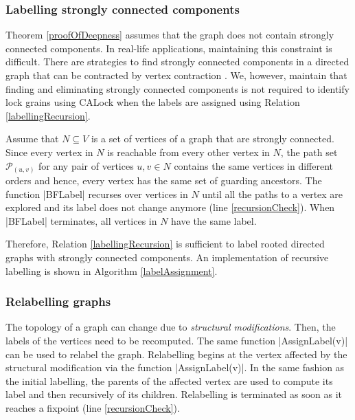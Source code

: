 \subsubsection{Labelling strongly connected components}

Theorem \ref{proofOfDeepness} assumes that the graph does not contain strongly connected components. In real-life applications, maintaining this constraint is difficult. There are strategies to find strongly connected components in a directed graph \cite{sharir1981strong, tarjan1972depth, cheriyan1996algorithms} that can be contracted by vertex contraction \cite{walsh2006hub}. We, however, maintain that finding and eliminating strongly connected components is not required to identify lock grains using CALock when the labels are assigned using Relation \ref{labellingRecursion}. 


Assume that $N \subseteq V$ is a set of vertices of a graph that are strongly connected. Since every vertex in $N$ is reachable from every other vertex in $N$, the path set $\mathcal{P}_{(u,v)}$ for any pair of vertices $u, v\in N$ contains the same vertices in different orders and hence, every vertex has the same set of guarding ancestors. The function \inline|BFLabel| recurses over vertices in $N$ until all the paths to a vertex are explored and its label does not change anymore (line \ref{recursionCheck}). When \inline|BFLabel| terminates, all vertices in $N$ have the same label.

Therefore, Relation \ref{labellingRecursion} is sufficient to label rooted directed graphs with strongly connected components. An implementation of recursive labelling is shown in Algorithm \ref{labelAssignment}.

\subsubsection{Relabelling graphs} The topology of a graph can change due to \emph{structural modifications}. 
Then, the labels of the vertices need to be recomputed. 
The same function \inline|AssignLabel(v)| can be used to relabel the graph. 
Relabelling begins at the vertex affected by the structural modification via the function \inline|AssignLabel(v)|. 
In the same fashion as the initial labelling, the parents of the affected vertex are used to compute its label and then recursively of its children. Relabelling is terminated as soon as it reaches a fixpoint (line \ref{recursionCheck}).  





